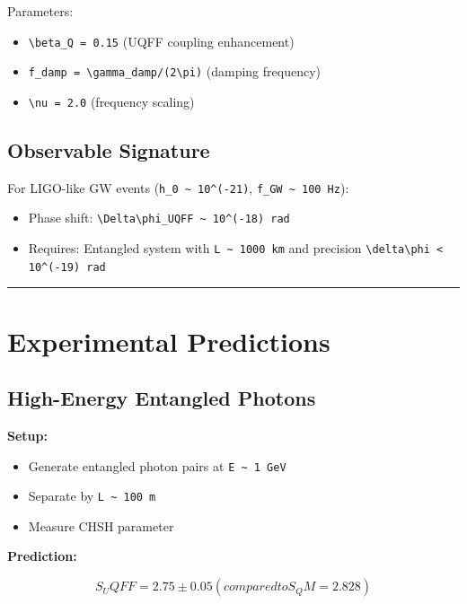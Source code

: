\documentclass[12pt,a4paper]{article}
\begin{document}
Parameters:

\begin{itemize}
  \item \texttt{\textbackslash beta\_Q = 0.15} (UQFF coupling enhancement)
  \item \texttt{f\_damp = \textbackslash gamma\_damp/(2\textbackslash pi)} (damping frequency)
  \item \texttt{\textbackslash nu = 2.0} (frequency scaling)
\end{itemize}

\subsection{Observable Signature}

For LIGO-like GW events (\texttt{h\_0 \textasciitilde{} 10\^{}(-21)}, \texttt{f\_GW \textasciitilde{} 100 Hz}):

\begin{itemize}
  \item Phase shift: \texttt{\textbackslash Delta\textbackslash phi\_UQFF \textasciitilde{} 10\^{}(-18) rad}
  \item Requires: Entangled system with \texttt{L \textasciitilde{} 1000 km} and precision \texttt{\textbackslash delta\textbackslash phi < 10\^{}(-19) rad}
\end{itemize}

\medskip\hrule\medskip

\section{Experimental Predictions}

\subsection{High-Energy Entangled Photons}

\textbf{Setup:}

\begin{itemize}
  \item Generate entangled photon pairs at \texttt{E \textasciitilde{} 1 GeV}
  \item Separate by \texttt{L \textasciitilde{} 100 m}
  \item Measure CHSH parameter
\end{itemize}

\textbf{Prediction:}

\begin{equation}
S_UQFF = 2.75 \pm 0.05 (compared to S_QM = 2.828)
\end{equation}
\end{document}
